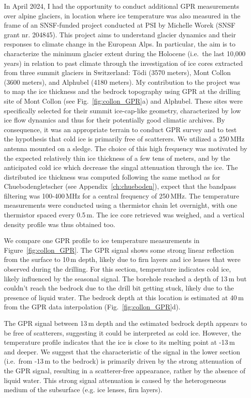 In April 2024, I had the opportunity to conduct additional GPR measurements over alpine glaciers, in location where ice temperature was also measured in the frame of an SNSF-funded project conducted at PSI by Michelle Worek (SNSF grant nr. 204845). This project aims to understand glacier dynamics and their responses to climate change in the European Alps. In particular, the aim is to characterize the minimum glacier extent during the Holocene (i.e.\ the last 10,000 years) in relation to past climate through the investigation of ice cores extracted from three summit glaciers in Switzerland: Tödi (3570 meters), Mont Collon (3600 meters), and Alphubel (4180 meters). My contribution to the project was to map the ice thickness and the bedrock topography using GPR at the drilling site of Mont Collon (see Fig.~\ref{fig:collon_GPR}a) and Alphubel. These sites were specifically selected for their summit ice-cap-like geometry, characterized by low ice flow dynamics and thus for their potentially good climatic archives. By consequence, it was an appropriate terrain to conduct GPR survey and to test the hypothesis that cold ice is primarily free of scatterers. We utilized a 250\,MHz antenna mounted on a sledge. The choice of this high frequency was motivated by the expected relatively thin ice thickness of a few tens of meters, and by the anticipated cold ice which decrease the singal attenuation through the ice. The distributed ice thickness was computed following the same method as for Chuebodengletscher (see Appendix~\ref{ch:chueboden}), expect that the bandpass filtering was 100-400\,MHz for a central frequency of 250\,MHz. The temperature measurements were conducted using a thermistor chain let overnight, with one thermistor spaced every 0.5\,m. The ice core retrieved was weighed, and a vertical density profile was thus obtained too.
%

We compare one GPR profile to ice temperature measurements in Figure~\ref{fig:collon_GPR}. The GPR signal shows some strong linear reflection from the surface to 10\,m depth, likely due to firn layers and ice lenses that were observed during the drilling. For this section, temperature indicates cold ice, likely influenced by the seasonal signal. The borehole reached a depth of 13\,m but couldn't reach the bedrock due to the drill bit getting stuck, likely due to the presence of liquid water. The bedrock depth at this location is estimated at 40\,m from the GPR data interpolation (Fig.~\ref{fig:collon_GPR}d).
%

The GPR signal between 13\,m depth and the estimated bedrock depth appears to be free of scatterers, suggesting it could be interpreted as cold ice. However, the temperature profile indicates that the ice is close to its melting point at -13\,m and deeper. We suggest that the characteristic of the signal in the lower section (i.e.\ from -13\,m to the bedrock) is primarily driven by the strong attenuation of the GPR signal, resulting in a scatterer-free appearance, rather by the absence of liquid water. This strong signal attenuation is caused by the heterogeneous medium of the subsurface (e.g. ice lenses, firn layers). 
% 

